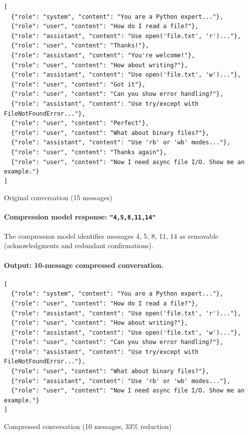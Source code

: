 \documentclass[english]{article}
\begin{document}
\begin{listing}[H]
\begin{verbatim}
[
  {"role": "system", "content": "You are a Python expert..."},
  {"role": "user", "content": "How do I read a file?"},
  {"role": "assistant", "content": "Use open('file.txt', 'r')..."},
  {"role": "user", "content": "Thanks!"},
  {"role": "assistant", "content": "You're welcome!"},
  {"role": "user", "content": "How about writing?"},
  {"role": "assistant", "content": "Use open('file.txt', 'w')..."},
  {"role": "user", "content": "Got it"},
  {"role": "user", "content": "Can you show error handling?"},
  {"role": "assistant", "content": "Use try/except with FileNotFoundError..."},
  {"role": "user", "content": "Perfect"},
  {"role": "user", "content": "What about binary files?"},
  {"role": "assistant", "content": "Use 'rb' or 'wb' modes..."},
  {"role": "user", "content": "Thanks again"},
  {"role": "user", "content": "Now I need async file I/O. Show me an example."}
]
\end{verbatim}
\caption{Original conversation (15 messages)}
\end{listing}

\paragraph{Compression model response: \texttt{"4,5,8,11,14"}}

The compression model identifies messages 4, 5, 8, 11, 14 as removable (acknowledgments and redundant confirmations).

\paragraph{Output: 10-message compressed conversation.}

\begin{listing}[H]
\begin{verbatim}
[
  {"role": "system", "content": "You are a Python expert..."},
  {"role": "user", "content": "How do I read a file?"},
  {"role": "assistant", "content": "Use open('file.txt', 'r')..."},
  {"role": "user", "content": "How about writing?"},
  {"role": "assistant", "content": "Use open('file.txt', 'w')..."},
  {"role": "user", "content": "Can you show error handling?"},
  {"role": "assistant", "content": "Use try/except with FileNotFoundError..."},
  {"role": "user", "content": "What about binary files?"},
  {"role": "assistant", "content": "Use 'rb' or 'wb' modes..."},
  {"role": "user", "content": "Now I need async file I/O. Show me an example."}
]
\end{verbatim}
\caption{Compressed conversation (10 messages, 33\% reduction)}
\end{listing}
\end{document}

